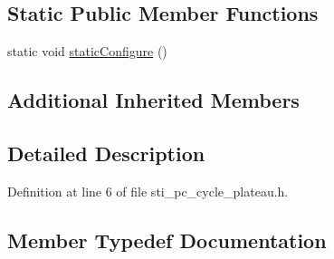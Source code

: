 \subsection*{Static Public Member Functions}
\begin{DoxyCompactItemize}
\item 
static void \hyperlink{structsm__respira__1_1_1pc__cycle__inner__states_1_1StiPCCyclePlateau_a974b0fd58423dea9273e7068cbaa2d9a}{static\+Configure} ()
\end{DoxyCompactItemize}
\subsection*{Additional Inherited Members}


\subsection{Detailed Description}


Definition at line 6 of file sti\+\_\+pc\+\_\+cycle\+\_\+plateau.\+h.



\subsection{Member Typedef Documentation}
\mbox{\label{structsm__respira__1_1_1pc__cycle__inner__states_1_1StiPCCyclePlateau_a0c51f165d5ab7bc19d821cb2d9b7154d}} 
